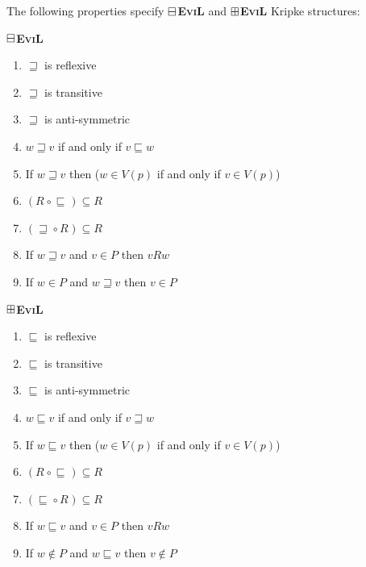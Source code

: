 \begin{definition}The following properties specify 
\textbf{$\boxminus$\textsc{EviL}} and \textbf{$\boxplus$\textsc{EviL}} Kripke structures:

\begin{minipage}[b]{0.5\linewidth}
\begin{center}
\textbf{$\boxminus$\textsc{EviL}}
\end{center}
  \begin{enumerate}[label=\textup{(\emph{\Roman*})$^\BM$}, topsep=0.0in, parsep=0.075in]
    \item \label{MpI} $\sqsupseteq$ is reflexive
    \item \label{Mptrans} $\sqsupseteq$ is transitive 
    \item \label{Mpantisym} $\sqsupseteq$ is anti-symmetric
    \item \label{Mpreverse} $w \sqsupseteq v$ if and only if $v
    \sqsubseteq w$
   \item \label{Mislandiff} If $w \sqsupseteq v$ then ($w \in V (p)$ if and only if $v \in V (p)$)
     \item \label{MpV} $(R^{} \circ \sqsubseteq^{}) \subseteq
    R^{} $
     \item \label{MpVI} $(\sqsupseteq^{} \circ R^{}) \subseteq
R^{}$
     \item\label{MpVII} 
If $w \sqsupseteq v$ and $v \in P$ then $v R w$

    \item\label{MpIX} If $w \in P$ and $w \sqsupseteq v$ then $v
     \in P$
  \end{enumerate}
\end{minipage}
\hspace{0.5cm}
\begin{minipage}[b]{0.5\linewidth}
\begin{center}
\textbf{$\boxplus$\textsc{EviL}}
\end{center}
  \begin{enumerate}[label=\textup{(\emph{\Roman*})$^\BP$}, topsep=0.0in, parsep=0.075in]
    \item \label{PpI} $\sqsubseteq$ is reflexive
    \item \label{Pptrans} $\sqsubseteq$ is transitive 
    \item \label{Ppantisym} $\sqsubseteq$ is anti-symmetric
    \item \label{Ppreverse} $w \sqsubseteq v$ if and only if $v \sqsupseteq w$
   \item \label{Pislandiff} If $w \sqsubseteq v$ then ($w \in V (p)$ if and only if $v \in V (p)$)
     \item \label{PpV}  $(R^{} \circ \sqsubseteq^{}) \subseteq
    R^{} $
     \item \label{PpVI} $(\sqsubseteq^{} \circ R^{}) \subseteq
 R^{}$
     \item\label{PpVII} If $w \sqsubseteq v$ and $v \in P$ then $v
       R w$

    \item\label{PpIX} If $w \nin P$ and $w \sqsubseteq v$ then $v
     \nin P$
  \end{enumerate}
\end{minipage}
\end{definition}

